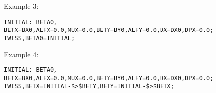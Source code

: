 Example 3: 
\begin{verbatim}
INITIAL: BETA0, BETX=BX0,ALFX=0.0,MUX=0.0,BETY=BY0,ALFY=0.0,DX=DX0,DPX=0.0;
TWISS,BETA0=INITIAL;
\end{verbatim}

Example 4: 
\begin{verbatim}
INITIAL: BETA0, BETX=BX0,ALFX=0.0,MUX=0.0,BETY=BY0,ALFY=0.0,DX=DX0,DPX=0.0;
TWISS,BETX=INITIAL-$>$BETY,BETY=INITIAL-$>$BETX;
\end{verbatim}





